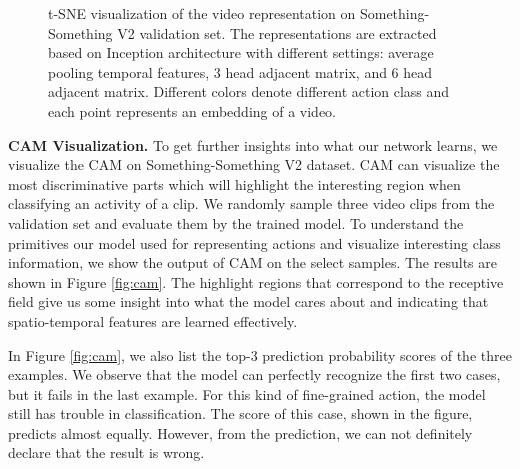 \documentclass[conference,compsoc]{IEEEtran}
\begin{document}
\begin{figure*}[h]
        \centering
        \caption{t-SNE visualization of the video representation on Something-Something V2 validation set. The representations are extracted based on Inception architecture with different settings: average pooling temporal features, 3 head adjacent matrix, and 6 head adjacent matrix. Different colors denote different action class and each point represents an embedding of a video.}
        \label{fig:tsne}
    \end{figure*}
    
    \noindent\textbf{CAM Visualization.} To get further insights into what our network learns, we visualize the CAM \cite{zhou2016learning} on Something-Something V2 dataset. CAM can visualize the most discriminative parts which will highlight the interesting region when classifying an activity of a clip. We randomly sample three video clips from the validation set and evaluate them by the trained model. To understand the primitives our model used for representing actions and visualize interesting class information, we show the output of CAM on the select samples. The results are shown in Figure \ref{fig:cam}. The highlight regions that correspond to the receptive field give us some insight into what the model cares about and indicating that spatio-temporal features are learned effectively.
    
    In Figure \ref{fig:cam}, we also list the top-3 prediction probability scores of the three examples. We observe that the model can perfectly recognize the first two cases, but it fails in the last example. For this kind of fine-grained action, the model still has trouble in classification. The score of this case, shown in the figure, predicts almost equally. However, from the prediction, we can not definitely declare that the result is wrong. 
    
\end{document}
